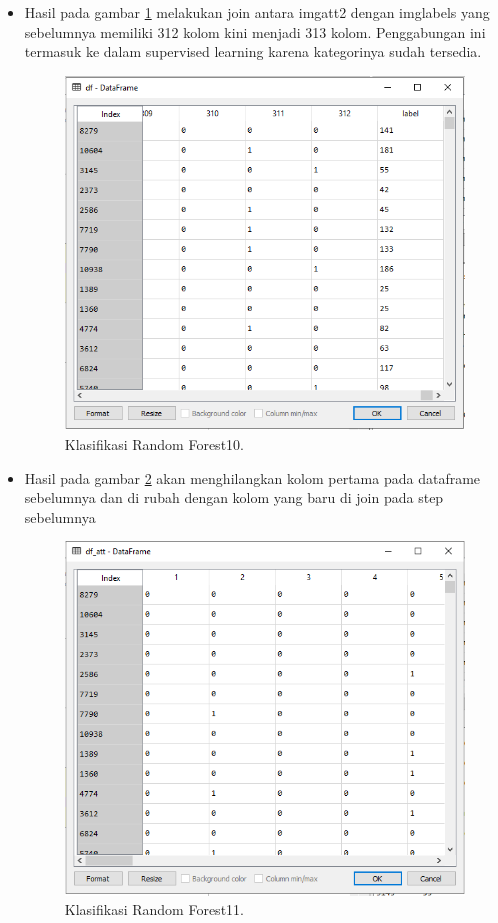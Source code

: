 \begin{enumerate}
\begin{itemize}
\item Hasil pada gambar \ref{rons10} melakukan join antara imgatt2 dengan imglabels yang sebelumnya memiliki 312 kolom kini menjadi 313 kolom. Penggabungan ini termasuk ke dalam supervised learning karena kategorinya sudah tersedia.
 		\begin{figure}[ht]
		\centerline{\includegraphics[width=1\textwidth]{figures/im/rons10.png}}
		\caption{Klasifikasi Random Forest10.}
		\label{rons10}
		\end{figure}

\item Hasil pada gambar \ref{rons11} akan menghilangkan kolom pertama pada dataframe sebelumnya dan di rubah dengan kolom yang baru di join pada step sebelumnya
 		\begin{figure}[ht]
		\centerline{\includegraphics[width=1\textwidth]{figures/im/rons11.png}}
		\caption{Klasifikasi Random Forest11.}
		\label{rons11}
		\end{figure}


\end{itemize}
\end{enumerate}

